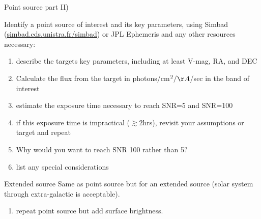 \begin{frame}{Point source part II)}

Identify a point source of interest and its key parameters, using Simbad (\url{simbad.cds.unistra.fr/simbad}) or JPL Ephemeris and any other resources necessary:

 \begin{enumerate}
\item describe the targets key parameters, including at least V-mag, RA, and DEC
\item Calculate the flux from the target in photons/cm$^2/\AA $/sec in the band of interest
 \item estimate the exposure time necessary to reach SNR=5 and SNR=100
 \item if this exposure time is impractical ($\gtrsim$2hrs), revisit your assumptions or target and repeat
 \item Why would you want to reach SNR 100 rather than 5?
 \item list any special considerations
\end{enumerate}
\end{frame}

\begin{frame}{Extended source}
Same as point source but for an extended source (solar system through extra-galactic is acceptable).

 \begin{enumerate}
 \item repeat point source but add surface brightness.
\end{enumerate}
\end{frame}





